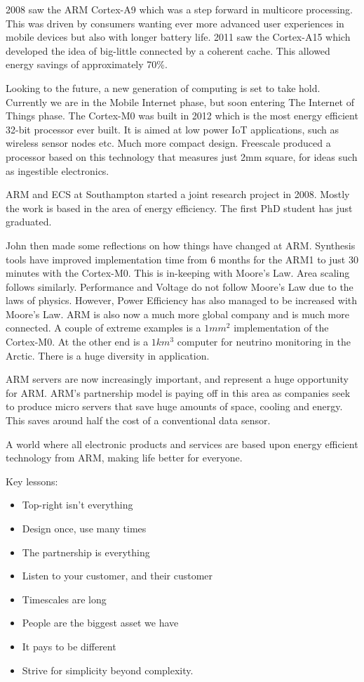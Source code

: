 2008 saw the ARM Cortex-A9 which was a step forward in multicore processing. 
This was driven by consumers wanting ever more advanced user experiences in mobile devices but also with longer battery life. 
2011 saw the Cortex-A15 which developed the idea of big-little connected by a coherent cache. 
This allowed energy savings of approximately 70\%. 

Looking to the future, a new generation of computing is set to take hold. 
Currently we are in the Mobile Internet phase, but soon entering The Internet of Things phase. 
The Cortex-M0 was built in 2012 which is the most energy efficient 32-bit processor ever built. 
It is aimed at low power IoT applications, such as wireless sensor nodes etc. Much more compact design. 
Freescale produced a processor based on this technology that measures just 2mm square, for ideas such as ingestible electronics.

ARM and ECS at Southampton started a joint research project in 2008.
 Mostly the work is based in the area of energy efficiency. 
The first PhD student has just graduated.

John then made some reflections on how things have changed at ARM. 
Synthesis tools have improved implementation time from 6 months for the ARM1 to just 30 minutes with the Cortex-M0. 
This is in-keeping with Moore's Law. 
Area scaling follows similarly. 
Performance and Voltage do not follow Moore's Law due to the laws of physics. 
However, Power Efficiency has also managed to be increased with Moore's Law. 
ARM is also now a much more global company and is much more connected. 
A couple of extreme examples is a $1 mm^2$ implementation of the Cortex-M0. 
At the other end is a $1 km^3$ computer for neutrino monitoring in the Arctic. 
There is a huge diversity in application. 

ARM servers are now increasingly important, and represent a huge opportunity for ARM. 
ARM's partnership model is paying off in this area as companies seek to produce micro servers that save huge amounts of space, cooling and energy. 
This saves around half the cost of a conventional data sensor.

A world where all electronic products and services are based upon energy efficient technology from ARM, making life better for everyone.

Key lessons:
\begin{itemize}
\item Top-right isn't everything
\item Design once, use many times
\item The partnership is everything
\item Listen to your customer, and their customer
\item Timescales are long
\item People are the biggest asset we have
\item It pays to be different
\item Strive for simplicity beyond complexity.
\end{itemize}

